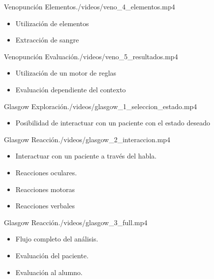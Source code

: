 \begin{step}{Venopunción Elementos}{./videos/veno_4_elementos.mp4}
\begin{itemize}
    \item Utilización de elementos
    \item Extracción de sangre
\end{itemize}
\end{step}


\begin{step}{Venopunción Evaluación}{./videos/veno_5_resultados.mp4}
\begin{itemize}
    \item Utilización de un motor de reglas
    \item Evaluación dependiente del contexto
\end{itemize}
\end{step}


\begin{step}{Glasgow Exploración}{./videos/glasgow_1_seleccion_estado.mp4}
\begin{itemize}
    \item Posibilidad de interactuar con un paciente con el estado deseado
\end{itemize}
\end{step}

\begin{step}{Glasgow Reacción}{./videos/glasgow_2_interaccion.mp4}
\begin{itemize}
    \item Interactuar con un paciente a través del habla.
    \item Reacciones oculares.
    \item Reacciones motoras
    \item Reacciones verbales
\end{itemize}
\end{step}


\begin{step}{Glasgow Reacción}{./videos/glasgow_3_full.mp4}
\begin{itemize}
    \item Flujo completo del análisis.
    \item Evaluación del paciente.
    \item Evaluación al alumno.
\end{itemize}
\end{step}

